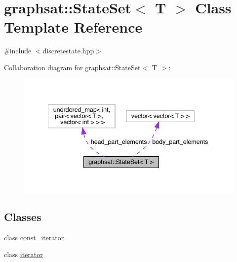 \hypertarget{classgraphsat_1_1_state_set}{}\section{graphsat\+::State\+Set$<$ T $>$ Class Template Reference}
\label{classgraphsat_1_1_state_set}


{\ttfamily \#include $<$discretestate.\+hpp$>$}



Collaboration diagram for graphsat\+::State\+Set$<$ T $>$\+:
\nopagebreak
\begin{figure}[H]
\begin{center}
\leavevmode
\includegraphics[width=340pt]{classgraphsat_1_1_state_set__coll__graph}
\end{center}
\end{figure}
\subsection*{Classes}
\begin{DoxyCompactItemize}
\item 
class \mbox{\hyperlink{classgraphsat_1_1_state_set_1_1const__iterator}{const\+\_\+iterator}}
\item 
class \mbox{\hyperlink{classgraphsat_1_1_state_set_1_1iterator}{iterator}}
\end{DoxyCompactItemize}
